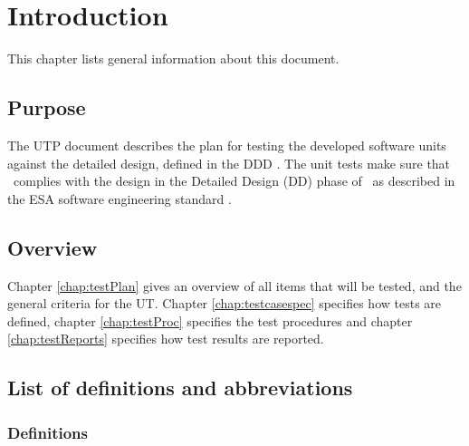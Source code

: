 \chapter{Introduction}\label{chap:intro}
This chapter lists general information about this document.

\section{Purpose}
The UTP document describes the plan for testing the developed software units against the
detailed design, defined in the DDD \cite{DDD}. The unit tests make sure that \projectname\ complies
with the design in the Detailed Design (DD) phase of \projectname\ as described in
the ESA software engineering standard \cite{esa}.

\section{Overview}
\label{sec:overview}

Chapter \ref{chap:testPlan} gives an overview of all items that will be tested, and the general criteria for the UT.
Chapter \ref{chap:testcasespec} speciﬁes how tests are defined, chapter \ref{chap:testProc} specifies the test procedures and chapter \ref{chap:testReports} speciﬁes how test results are reported.


\section{List of definitions and abbreviations}
\label{sec:listofdef}


\subsection{Definitions}
\label{subsec:def}


